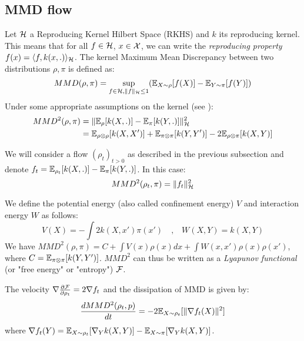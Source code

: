 \subsection{MMD flow}



Let ${{\mathcal H}}$ a Reproducing Kernel Hilbert Space (RKHS) and $k$ its reproducing kernel. This means that for all $f \in {{\mathcal H}}$, $x \in {{\mathcal X}}$, we can write the \textit{reproducing property} $f(x)=\langle f, k(x,.) \rangle_{{{\mathcal H}}}$. The kernel Maximum Mean Discrepancy between two distributions $\rho,\pi$ is defined as:
\begin{equation}
MMD(\rho,\pi)=\sup_{f \in {{\mathcal H}},  \|f\|_{{{\mathcal H}}}\le 1} ({{\mathbb E}}_{X \sim \rho}[f(X)]-{{\mathbb E}}_{Y \sim \pi}[f(Y)])
\end{equation}
Under some appropriate assumptions on the kernel (see \cite{gretton2012kernel}):
\begin{align}
MMD^2(\rho,\pi)&=\|{{\mathbb E}}_{\rho}[k(X,.)] - {{\mathbb E}}_{\pi}[k(Y,.)]\|^2_{{{\mathcal H}}}\\
&={{\mathbb E}}_{\rho \otimes \rho}[k(X,X')]+{{\mathbb E}}_{\pi \otimes \pi}[k(Y,Y')] - 2{{\mathbb E}}_{\rho \otimes \pi}[k(X,Y)]
\end{align}

We will consider a flow $(\rho_t)_{t>0}$ as described in the previous subsection and denote $f_t= {{\mathbb E}}_{\rho_t}[k(X,.)]- {{\mathbb E}}_{\pi}[k(Y,.)]$. In this case:
\begin{equation}
MMD^2(\rho_t,\pi)=\|f_t\|^2_{{{\mathcal H}}}
\end{equation} 

We define the potential energy (also called confinement energy) $V$ and interaction energy $W$ as follows:
\begin{equation}
V(X)=-\int 2 k(X,x')\pi(x') \quad \text{,} \quad
W(X,Y)=k(X,Y)
\end{equation}
We have $MMD^2(\rho,\pi)=C+ \int V(x) \rho(x)dx + \int W(x,x')\rho(x)\rho(x')$, where $C={{\mathbb E}}_{\pi\otimes \pi}[k(Y,Y')]$. $MMD^2$ can thus be written as a \textit{Lyapunov functional} (or "free energy" or "entropy") ${{\mathcal F}}$.


\begin{proposition}\label{prop:mmd_flow}
 The velocity $\nabla \frac{\partial{{{\mathcal F}}}}{\partial{\rho_t}}=2 \nabla f_t$ and the dissipation of MMD is given by:  
	\begin{equation}
	\frac{d MMD^2(\rho_t, p)}{dt}=-2 {{\mathbb E}}_{X \sim \rho_t}[\|\nabla f_t(X)\|^2]
	\end{equation}
	where $\nabla f_t(Y)= {{\mathbb E}}_{X \sim \rho_t}[\nabla_{Y}k(X,Y)] -  {{\mathbb E}}_{X \sim \pi}[\nabla_{Y}k(X,Y)]$.
\end{proposition}

